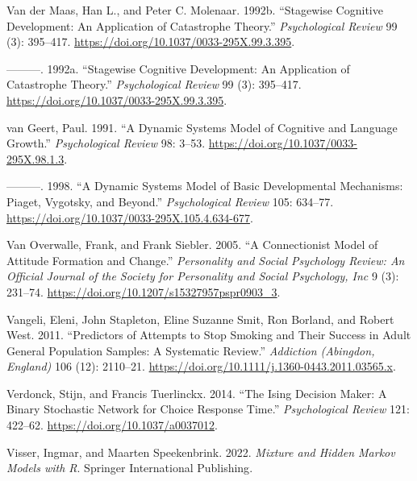 \documentclass[
  letterpaper,
]{scrbook}
\newlength{\cslhangindent}
\newlength{\cslentryspacingunit} %
\newenvironment{CSLReferences}[2] %
 {%
  \setlength{\parindent}{0pt}
  \ifodd #1
  \let\oldpar\par
  \def\par{\hangindent=\cslhangindent\oldpar}
  \fi
  \setlength{\parskip}{#2\cslentryspacingunit}
 }%
 {}
\begin{document}
\begin{CSLReferences}{1}{0}
\leavevmode{}%
Van der Maas, Han L., and Peter C. Molenaar. 1992b. {``Stagewise
Cognitive Development: {An} Application of Catastrophe Theory.''}
\emph{Psychological Review} 99 (3): 395--417.
\url{https://doi.org/10.1037/0033-295X.99.3.395}.

\leavevmode{}%
---------. 1992a. {``Stagewise Cognitive Development: An Application of
Catastrophe Theory.''} \emph{Psychological Review} 99 (3): 395--417.
\url{https://doi.org/10.1037/0033-295X.99.3.395}.

\leavevmode{}%
van Geert, Paul. 1991. {``A Dynamic Systems Model of Cognitive and
Language Growth.''} \emph{Psychological Review} 98: 3--53.
\url{https://doi.org/10.1037/0033-295X.98.1.3}.

\leavevmode{}%
---------. 1998. {``A Dynamic Systems Model of Basic Developmental
Mechanisms: {Piaget}, {Vygotsky}, and Beyond.''} \emph{Psychological
Review} 105: 634--77.
\url{https://doi.org/10.1037/0033-295X.105.4.634-677}.

\leavevmode{}%
Van Overwalle, Frank, and Frank Siebler. 2005. {``A Connectionist Model
of Attitude Formation and Change.''} \emph{Personality and Social
Psychology Review: An Official Journal of the Society for Personality
and Social Psychology, Inc} 9 (3): 231--74.
\url{https://doi.org/10.1207/s15327957pspr0903_3}.

\leavevmode{}%
Vangeli, Eleni, John Stapleton, Eline Suzanne Smit, Ron Borland, and
Robert West. 2011. {``Predictors of Attempts to Stop Smoking and Their
Success in Adult General Population Samples: A Systematic Review.''}
\emph{Addiction (Abingdon, England)} 106 (12): 2110--21.
\url{https://doi.org/10.1111/j.1360-0443.2011.03565.x}.

\leavevmode{}%
Verdonck, Stijn, and Francis Tuerlinckx. 2014. {``The {Ising Decision
Maker}: {A} Binary Stochastic Network for Choice Response Time.''}
\emph{Psychological Review} 121: 422--62.
\url{https://doi.org/10.1037/a0037012}.

\leavevmode{}%
Visser, Ingmar, and Maarten Speekenbrink. 2022. \emph{Mixture and
{Hidden Markov Models} with {R}}. {Springer International Publishing}.


\end{CSLReferences}
\end{document}
